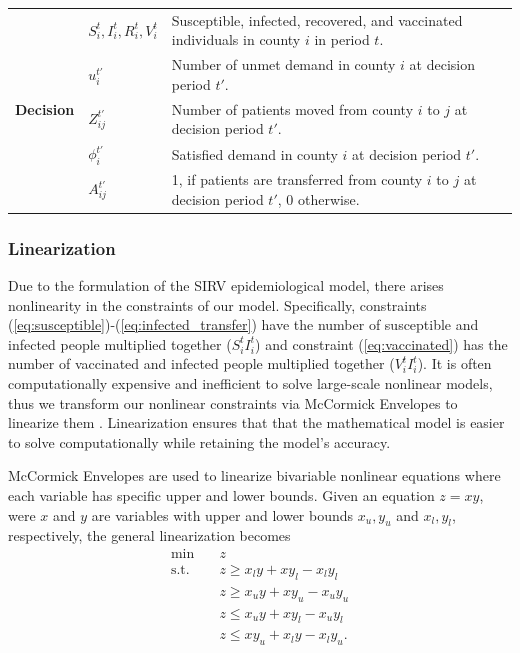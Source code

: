 \documentclass{article}
\begin{document}
\begin{table}[h]
\begin{tabular}{|p{}|p{}|p{}|}
        \hline
        \multirow{5}{*}{\textbf{Decision}}
        \multirow{5}{*}{\textbf{Variables}} 
        & $S_i^t, I_i^t, R_i^t, V_i^t$ & Susceptible, infected, recovered, and vaccinated individuals in county $i$ in period $t$. \\
        & $u_i^{t'}$ & Number of unmet demand in county $i$ at decision period $t'$. \\
        & $Z_{ij}^{t'}$ & Number of patients moved from county $i$ to $j$ at decision period $t'$. \\
        & $\phi_i^{t'}$ & Satisfied demand in county $i$ at decision period $t'$. \\
        & $A_{ij}^{t'}$ & 1, if patients are transferred from county $i$ to $j$ at decision period $t'$, 0 otherwise. \\
        \hline
    \end{tabular}\label{tab:modelNotation}
\end{table}

\subsubsection{Linearization}
Due to the formulation of the SIRV epidemiological model, there arises nonlinearity in the constraints of our model. Specifically, constraints (\ref{eq:susceptible})-(\ref{eq:infected_transfer}) have the number of susceptible and infected people multiplied together ($S_i^t I_i^t$) and constraint (\ref{eq:vaccinated}) has the number of vaccinated and infected people multiplied together ($V_i^t I_i^t$). It is often computationally expensive and inefficient to solve large-scale nonlinear models, thus we transform our nonlinear constraints via McCormick Envelopes to linearize them \parencite{mccormick1976computability}. Linearization ensures that that the mathematical model is easier to solve computationally while retaining the model's accuracy.

McCormick Envelopes are used to linearize bivariable nonlinear equations where each variable has specific upper and lower bounds. Given an equation $ z = xy $, were $x$ and $y$ are variables with upper and lower bounds $ x_u, y_u$ and $x_l, y_l$, respectively, the general linearization becomes 
\begin{align*}
        \min \quad & z \nonumber \\
        \text{s.t.} \quad 
        &z \geq x_l y + x y_l - x_l y_l \\
        &z \geq x_u y + x y_u - x_u y_u \\
        &z \leq x_u y + x y_l - x_u y_l \\
        &z \leq x y_u + x_l y - x_l y_u.
\end{align*}
\end{document}
